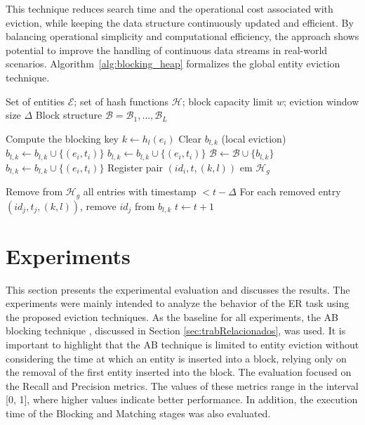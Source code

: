 \documentclass{ieeeaccess}
\begin{document}
This technique reduces search time and the operational cost associated with eviction, while keeping the data structure continuously updated and efficient. By balancing operational simplicity and computational efficiency, the approach shows potential to improve the handling of continuous data streams in real-world scenarios. Algorithm~\ref{alg:blocking_heap} formalizes the global entity eviction technique.

\begin{algorithm}[H]
\caption{Entity Eviction with Global Control}
\label{alg:blocking_heap}
\begin{algorithmic}[1]
\Require Set of entities $\mathcal{E}$; set of hash functions $\mathcal{H}$; block capacity limit $w$; eviction window size $\Delta$
\Ensure Block structure $\mathcal{B} = {\mathcal{B}_1, \dots, \mathcal{B}_L}$
           
          \State Compute the blocking key $k \gets h_l(e_i)$   
                \State Clear $b_{l,k}$ (local eviction)
                 \State $b_{l,k} \gets b_{l,k} \cup \{(e_i, t_i)\}$
            \Else
                 \State $b_{l,k} \gets b_{l,k} \cup \{(e_i, t_i)\}$
            \EndIf
        \Else
            \State $\mathcal{B} \gets \mathcal{B} \cup \{b_{l,k}\}$
            \State $b_{l,k} \gets b_{l,k} \cup \{(e_i,t_i)\}$
        \EndIf
        \State Register pair $(id_i, t, (k, l))$ em $\mathcal{H}_g$ 
    \EndFor

    \State {}
        \State Remove from $\mathcal{H}_g$ all entries with timestamp $< t - \Delta$
        \State For each removed entry $(id_j, t_j, (k, l))$, remove $id_j$ from $b_{l,k}$
    \EndIf
    \State $t \gets t + 1$
\EndFor
\end{algorithmic}
\end{algorithm}

\section{Experiments} \label{sec:avaliacao}

This section presents the experimental evaluation and discusses the results. The experiments were mainly intended to analyze the behavior of the ER task using the proposed eviction techniques. As the baseline for all experiments, the AB blocking technique \cite{10.1109/TKDE.2024.3361022}, discussed in Section \ref{sec:trabRelacionados}, was used. It is important to highlight that the AB technique is limited to entity eviction without considering the time at which an entity is inserted into a block, relying only on the removal of the first entity inserted into the block. The evaluation focused on the Recall and Precision metrics. The values of these metrics range in the interval [0, 1], where higher values indicate better performance. In addition, the execution time of the Blocking and Matching stages was also evaluated.
\end{document}
